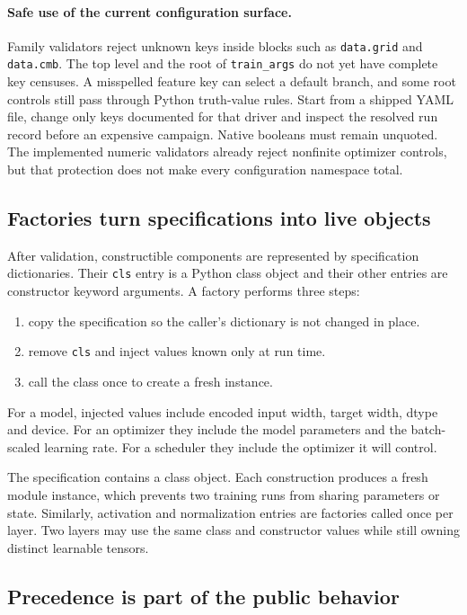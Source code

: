 \documentclass[10pt,aps,prd,twocolumn,nofootinbib]{revtex4-2}
\newcommand{\code}[1]{\texttt{#1}}
\begin{document}
\paragraph{Safe use of the current configuration surface.}
Family validators reject unknown keys inside blocks such as
\code{data.grid} and \code{data.cmb}.  The top level and the root of
\code{train\_args} do not yet have complete key censuses.  A misspelled feature
key can select a default branch, and some root controls still pass through
Python truth-value rules.  Start from a shipped YAML file, change only keys
documented for that driver and inspect the resolved run record before an
expensive campaign.  Native booleans must remain unquoted.  The implemented
numeric validators already reject nonfinite optimizer controls, but that
protection does not make every configuration namespace total.

\subsection{Factories turn specifications into live objects}

After validation, constructible components are represented by specification
dictionaries.  Their \code{cls} entry is a Python class object and their other
entries are constructor keyword arguments.  A factory performs three steps:
\begin{enumerate}
  \item copy the specification so the caller's dictionary is not changed in
        place.
  \item remove \code{cls} and inject values known only at run time.
  \item call the class once to create a fresh instance.
\end{enumerate}
For a model, injected values include encoded input width, target width, dtype
and device.  For an optimizer they include the model parameters and the
batch-scaled learning rate.  For a scheduler they include the optimizer it
will control.

The specification contains a class object.  Each construction produces a fresh
module instance, which prevents two training runs from sharing parameters or state.
Similarly, activation and normalization entries are factories called once per
layer.  Two layers may use the same class and constructor values while still
owning distinct learnable tensors.

\subsection{Precedence is part of the public behavior}
\end{document}
